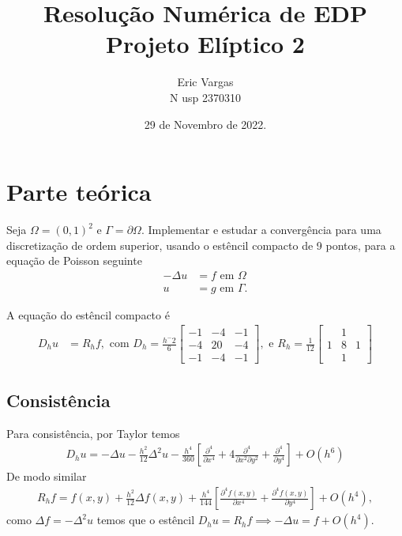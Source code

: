 \documentclass[]{article}
\title{\textbf{Resolução Numérica de EDP\\Projeto Elíptico 2}}
\author{ Eric Vargas\\N usp 2370310}
\date{29 de Novembro de 2022.}
\begin{document}
\maketitle
\tableofcontents
\newpage
\section{Parte teórica}
Seja $\Omega = (0,1)^2$ e $\Gamma = \partial \Omega$. Implementar e estudar a convergência para uma discretização de
ordem superior, usando o estêncil compacto de 9 pontos, para a equação de Poisson seguinte
\begin{align}
    -\Delta u &= f \text{ em } \Omega\\
    u &= g \text{ em } \Gamma.
\end{align}

A equação do estêncil compacto é
\begin{align}
    D_h u &= R_h f,\text{ com }
    D_h =  \frac{h^-2} 6 \left[ 
        \begin{array}{ccc}
            -1& -4& -1\\
            -4& 20& -4\\
            -1& -4& -1
        \end{array}\right], \text { e }
        R_h = \frac 1 {12} \left[ \begin{array}{ccc}            
            &1& \\
            1 &8& 1 \\
            &1&
        \end{array}
        \right]    
\end{align}

\subsection{Consistência}

Para consistência, por Taylor temos
\begin{align}
    D_h u = -\Delta u  -\frac{h^2} {12} \Delta^2u - \frac{h^4} {360} \left[ 
        \frac {\partial^4}{\partial x^4} 
        +4\frac{\partial^4}{\partial x^2 \partial y^2}
        +\frac{\partial^4}{\partial y^4}
    \right]
    + O(h^6)
\end{align}
De modo similar
\begin{align*}
    R_h f = f(x,y) + \frac{h^2} {12} \Delta f(x,y) + \frac{h^4} {144} \left[ 
        \frac{ \partial^4f(x,y)}{\partial x^4} +
        \frac{ \partial^4f(x,y)}{\partial y^4}
    \right] + O(h^4),
\end{align*}
como $\Delta f = - \Delta^2 u$ temos que o estêncil $D_h u = R_h f \implies -\Delta u = f + O(h^4)$.
\end{document}
